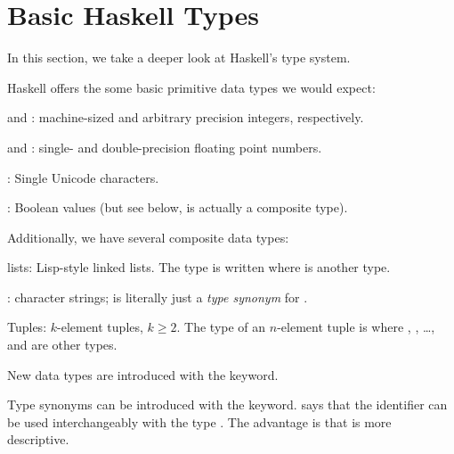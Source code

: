 \section{Basic Haskell Types}

In this section, we take a deeper look at Haskell's type system.

\begin{notelist}
\item Haskell offers the some basic primitive data types we would expect: \cite{haskell98}
\begin{notelist}
    \item {} and : machine-sized and arbitrary precision integers, respectively.
    \item {} and : single- and double-precision floating point numbers.
    \item {}: Single Unicode characters.
    \item {}: Boolean values (but see below,  is actually a composite type).
\end{notelist}

\item Additionally, we have several composite data types:
\begin{notelist}
    \item {} lists: Lisp-style linked lists. The type is written \code{[a]} where 
          is another type.
    \item {}: character strings;  is literally just a \textit{type synonym} for \code{[Char]}.
    \item Tuples: $k$-element tuples, $k \geq 2$. The type of an $n$-element tuple is  where
          , , \ldots, and  are other types.
\end{notelist}

\item New data types are introduced with the  keyword.

\item Type synonyms can be introduced with the  keyword.  says that 
      the identifier  can be used interchangeably with the type . The advantage
      is that  is more descriptive.


\end{notelist}
